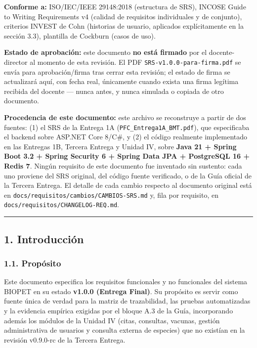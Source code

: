 \documentclass[
  spanish,
]{article}
\begin{document}
\textbf{Conforme a:} ISO/IEC/IEEE 29148:2018 (estructura de SRS), INCOSE
Guide to Writing Requirements v4 (calidad de requisitos individuales y
de conjunto), criterios INVEST de Cohn (historias de usuario, aplicados
explícitamente en la sección 3.3), plantilla de Cockburn (casos de uso).

\textbf{Estado de aprobación:} este documento \textbf{no está firmado}
por el docente-director al momento de esta revisión. El PDF
\texttt{SRS-\allowbreak{}v1.\allowbreak{}0.\allowbreak{}0-\allowbreak{}para-\allowbreak{}firma.\allowbreak{}pdf} se envía para aprobación/firma tras
cerrar esta revisión; el estado de firma se actualizará aquí, con fecha
real, únicamente cuando exista una firma legítima recibida del docente
--- nunca antes, y nunca simulada o copiada de otro documento.

\textbf{Procedencia de este documento:} este archivo se reconstruye a
partir de dos fuentes: (1) el SRS de la Entrega 1A
(\texttt{PFC\_\allowbreak{}Entrega1\allowbreak{}A\_\allowbreak{}BMT.\allowbreak{}pdf}), que especificaba el backend sobre
ASP.NET Core 8/C\#, y (2) el código realmente implementado en las
Entregas 1B, Tercera Entrega y Unidad IV, sobre \textbf{Java 21 + Spring
Boot 3.2 + Spring Security 6 + Spring Data JPA + PostgreSQL 16 + Redis
7}. Ningún requisito de este documento fue inventado sin sustento: cada
uno proviene del SRS original, del código fuente verificado, o de la
Guía oficial de la Tercera Entrega. El detalle de cada cambio respecto
al documento original está en
\texttt{docs/\allowbreak{}requisitos/\allowbreak{}cambios/\allowbreak{}CAMBIOS-\allowbreak{}SRS.\allowbreak{}md} y, fila por requisito,
en \texttt{docs/\allowbreak{}requisitos/\allowbreak{}CHANGELOG-\allowbreak{}REQ.\allowbreak{}md}.

\begin{center}\rule{0.5\linewidth}{0.5pt}\end{center}

\subsection{1. Introducción}\label{introducciuxf3n}

\subsubsection{1.1. Propósito}\label{propuxf3sito}

Este documento especifica los requisitos funcionales y no funcionales
del sistema BIOPET en su estado \textbf{v1.0.0 (Entrega Final)}. Su
propósito es servir como fuente única de verdad para la matriz de
trazabilidad, las pruebas automatizadas y la evidencia empírica exigidas
por el bloque A.3 de la Guía, incorporando además los módulos de la
Unidad IV (citas, consultas, vacunas, gestión administrativa de usuarios
y consulta externa de especies) que no existían en la revisión v0.9.0-rc
de la Tercera Entrega.
\end{document}
